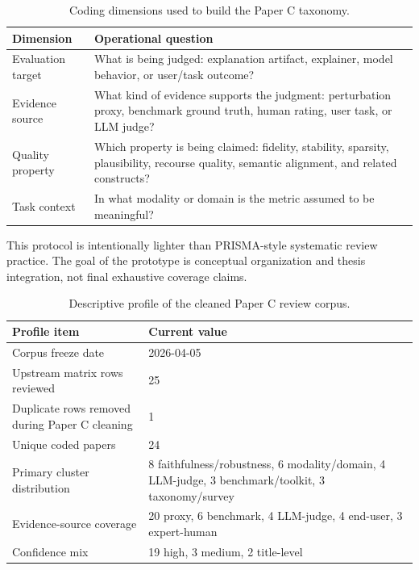 \documentclass[twoside,11pt]{article}
\begin{document}
\begin{table}[t]
\centering
\caption{Coding dimensions used to build the Paper C taxonomy.}
\begin{tabularx}{\linewidth}{l X}
\toprule
\textbf{Dimension} & \textbf{Operational question} \\
\midrule
Evaluation target & What is being judged: explanation artifact, explainer, model behavior, or user/task outcome? \\
Evidence source & What kind of evidence supports the judgment: perturbation proxy, benchmark ground truth, human rating, user task, or LLM judge? \\
Quality property & Which property is being claimed: fidelity, stability, sparsity, plausibility, recourse quality, semantic alignment, and related constructs? \\
Task context & In what modality or domain is the metric assumed to be meaningful? \\
\bottomrule
\end{tabularx}
\label{tab:coding}
\end{table}

This protocol is intentionally lighter than PRISMA-style systematic
review practice. The goal of the prototype is conceptual organization
and thesis integration, not final exhaustive coverage claims.

\begin{table}[t]
\centering
\caption{Descriptive profile of the cleaned Paper C review corpus.}
\begin{tabularx}{\linewidth}{l X}
\toprule
\textbf{Profile item} & \textbf{Current value} \\
\midrule
Corpus freeze date & 2026-04-05 \\
Upstream matrix rows reviewed & 25 \\
Duplicate rows removed during Paper C cleaning & 1 \\
Unique coded papers & 24 \\
Primary cluster distribution & 8 faithfulness/robustness, 6 modality/domain, 4 LLM-judge, 3 benchmark/toolkit, 3 taxonomy/survey \\
Evidence-source coverage & 20 proxy, 6 benchmark, 4 LLM-judge, 4 end-user, 3 expert-human \\
Confidence mix & 19 high, 3 medium, 2 title-level \\
\bottomrule
\end{tabularx}
\label{tab:corpus_profile}
\end{table}
\end{document}
